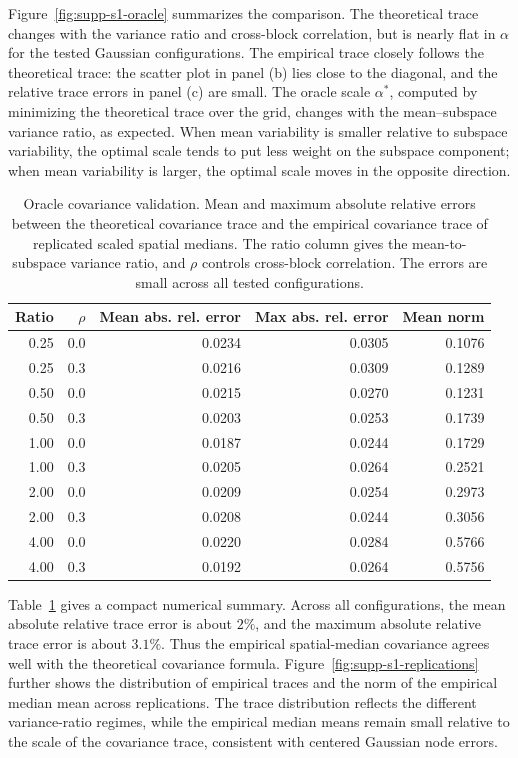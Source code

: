 \documentclass[11pt]{article}
\begin{document}
Figure~\ref{fig:supp-s1-oracle} summarizes the comparison.  The theoretical trace changes with the variance ratio and cross-block correlation, but is nearly flat in \(\alpha\) for the tested Gaussian configurations.  The empirical trace closely follows the theoretical trace: the scatter plot in panel (b) lies close to the diagonal, and the relative trace errors in panel (c) are small.  The oracle scale \(\alpha^*\), computed by minimizing the theoretical trace over the grid, changes with the mean--subspace variance ratio, as expected.  When mean variability is smaller relative to subspace variability, the optimal scale tends to put less weight on the subspace component; when mean variability is larger, the optimal scale moves in the opposite direction.

\begin{table}[ht]
\centering
\caption{
Oracle covariance validation.
Mean and maximum absolute relative errors between the theoretical covariance trace and the empirical covariance trace of replicated scaled spatial medians.  The ratio column gives the mean-to-subspace variance ratio, and \(\rho\) controls cross-block correlation.  The errors are small across all tested configurations.
}
\label{tab:supp-s1-error-summary}
\begin{tabular}{rrrrr}
\toprule
Ratio & \(\rho\) & Mean abs. rel. error & Max abs. rel. error & Mean norm \\
\midrule
0.25 & 0.0 & 0.0234 & 0.0305 & 0.1076 \\
0.25 & 0.3 & 0.0216 & 0.0309 & 0.1289 \\
0.50 & 0.0 & 0.0215 & 0.0270 & 0.1231 \\
0.50 & 0.3 & 0.0203 & 0.0253 & 0.1739 \\
1.00 & 0.0 & 0.0187 & 0.0244 & 0.1729 \\
1.00 & 0.3 & 0.0205 & 0.0264 & 0.2521 \\
2.00 & 0.0 & 0.0209 & 0.0254 & 0.2973 \\
2.00 & 0.3 & 0.0208 & 0.0244 & 0.3056 \\
4.00 & 0.0 & 0.0220 & 0.0284 & 0.5766 \\
4.00 & 0.3 & 0.0192 & 0.0264 & 0.5756 \\
\bottomrule
\end{tabular}
\end{table}

Table~\ref{tab:supp-s1-error-summary} gives a compact numerical summary.  Across all configurations, the mean absolute relative trace error is about \(2\%\), and the maximum absolute relative trace error is about \(3.1\%\).  Thus the empirical spatial-median covariance agrees well with the theoretical covariance formula.  Figure~\ref{fig:supp-s1-replications} further shows the distribution of empirical traces and the norm of the empirical median mean across replications.  The trace distribution reflects the different variance-ratio regimes, while the empirical median means remain small relative to the scale of the covariance trace, consistent with centered Gaussian node errors.
\end{document}
